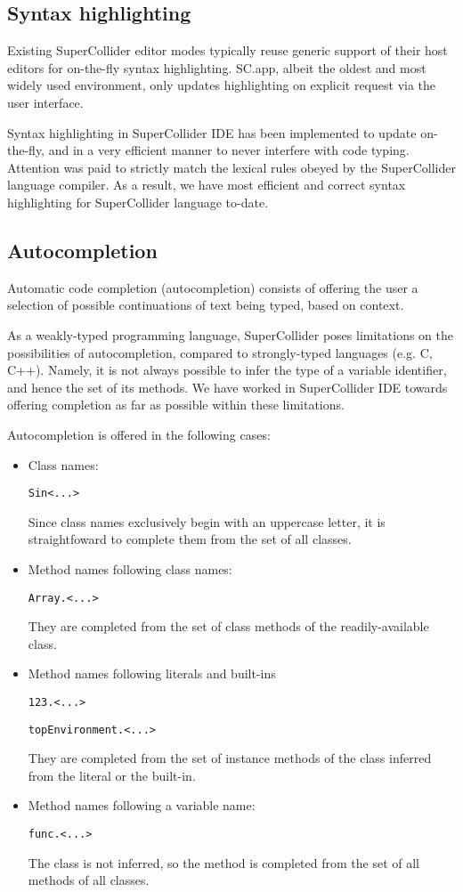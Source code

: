 \documentclass[11pt,a4paper]{article}
\begin{document}
\subsection{Syntax highlighting}

Existing SuperCollider editor modes typically reuse generic support of their host editors for
on-the-fly syntax highlighting. SC.app, albeit the oldest and most widely used environment, only
updates highlighting on explicit request via the user interface.

Syntax highlighting in SuperCollider IDE has been implemented to update on-the-fly, and in a very
efficient manner to never interfere with code typing. Attention was paid to strictly match the
lexical rules obeyed by the SuperCollider language compiler. As a result, we have most efficient and
correct syntax highlighting for SuperCollider language to-date.

\subsection{Autocompletion}

Automatic code completion (autocompletion) consists of offering the user a selection of possible
continuations of text being typed, based on context.

As a weakly-typed programming language, SuperCollider poses limitations on the possibilities of
autocompletion, compared to strongly-typed languages (e.g. C, C++). Namely, it is not always
possible to infer the type of a variable identifier, and hence the set of its methods. We have
worked in SuperCollider IDE towards offering completion as far as possible within these limitations.

Autocompletion is offered in the following cases:
\begin{itemize}
 \item Class names:

 \verb|Sin<...>|

 Since class names exclusively begin with an uppercase letter, it is straightfoward
 to complete them from the set of all classes.

 \item Method names following class names:

 \verb|Array.<...>|

 They are completed from the set of class methods of the
 readily-available class.

 \item Method names following literals and built-ins

 \verb|123.<...>|

 \verb|topEnvironment.<...>|

 They are completed from the set of instance methods of the class
 inferred from the literal or the built-in.

 \item Method names following a variable name:

 \verb|func.<...>|

 The class is not inferred, so the method is completed from the set of all methods of all classes.

\end{itemize}
\end{document}
